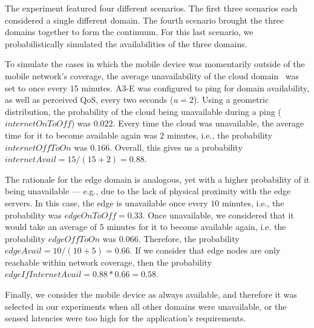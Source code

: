 The experiment featured four different scenarios. The first three scenarios each considered a single different domain. The fourth scenario brought the three domains together to form the continuum. For this last scenario, we probabilistically simulated the availabilities of the three domains. 

To simulate the cases in which the mobile device was momentarily outside of the mobile network's coverage, the average unavailability of the cloud domain~\cite{garcia2017bandwidth} was set to once every $15$ minutes. A3-E was configured to ping for domain availability, as well as perceived QoS, every two seconds ($u = 2$). Using a geometric distribution, the probability of the cloud being unavailable during a ping ($internetOnToOff$) was $0.022$. Every time the cloud was unavailable, the average time for it to become available again was $2$ minutes, i.e., the probability  $internetOffToOn$ was $0.166$. Overall, this gives us a probability $internetAvail=15/(15+2)=0.88$.


The rationale for the edge domain is analogous, yet with a higher probability of it being unavailable --- e.g., due to the lack of physical proximity with the edge servers. In this case, the edge is unavailable once every $10$ minutes, i.e., the probability was $edgeOnToOff = 0.33$. Once unavailable, we considered that it would take an average of $5$ minutes for it to become available again, i.e. the probability $edgeOffToOn$ was $0.066$. Therefore, the probability $edgeAvail=10/(10+5)=0.66$. If we consider that edge nodes are only reachable within network coverage, then the probability $edgeIfInternetAvail=0.88*0.66=0.58$.

Finally, we consider the mobile device as always available, and therefore it was selected in our experiments when all other domains were unavailable, or the sensed latencies were too high for the application's requirements.

